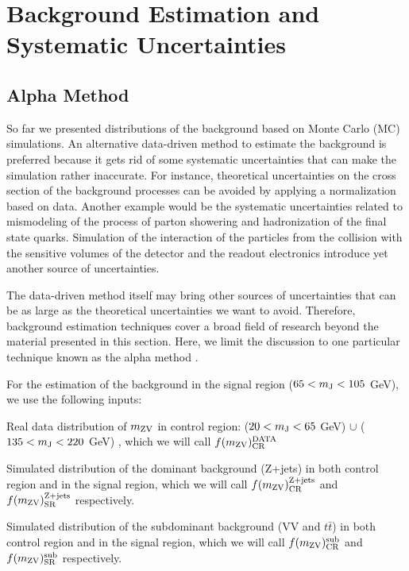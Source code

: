 \chapter{Background Estimation and Systematic Uncertainties}
\label{bkgEstimation}
\section{Alpha Method}
So far we presented distributions of the background based on Monte Carlo (MC) simulations. An alternative data-driven method to estimate the background is preferred because it gets rid of some systematic uncertainties that can make the simulation rather inaccurate. For instance, theoretical uncertainties on the cross section of the background processes can be avoided by applying a normalization based on data. Another example would be the systematic uncertainties related to mismodeling of the process of parton showering and hadronization of the final state quarks. Simulation of the interaction of the particles from the collision with the sensitive volumes of the detector and the readout electronics introduce yet another source of uncertainties. 

The data-driven method itself may bring other sources of uncertainties that can be as large as the theoretical uncertainties we want to avoid. Therefore, background estimation techniques cover a broad field of research beyond the material presented in this section. Here, we limit the discussion to one particular technique known as the alpha method \cite{Mozer:2016wzi}.  

For the estimation of the background in the signal region ($65 < m_\mathrm{J} < 105$ GeV), we use the following inputs:
\begin{compact_itemize}
\item Real data distribution of $m_\mathrm{ZV}$ in control region: ($20 < m_\mathrm{J} < 65$ GeV)  $\cup$ ($135 < m_\mathrm{J} <220$ GeV) , which we will call $f(m_\mathrm{ZV})^{\textrm{DATA}}_{\textrm{CR}}$
\item Simulated distribution of the dominant background (Z+jets) in  both control region and in the signal region, which we will call $f(m_\mathrm{ZV})^{\textrm{Z+jets}}_{\textrm{CR}}$ and $f(m_\mathrm{ZV})^{\textrm{Z+jets}}_{\textrm{SR}}$ respectively.
\item Simulated distribution of the subdominant background (VV and $t\bar{t}$) in  both control region and in the signal region, which we will call $f(m_\mathrm{ZV})^{\textrm{sub}}_{\textrm{CR}}$ and $f(m_\mathrm{ZV})^{\textrm{sub}}_{\textrm{SR}}$ respectively.
\end{compact_itemize}

